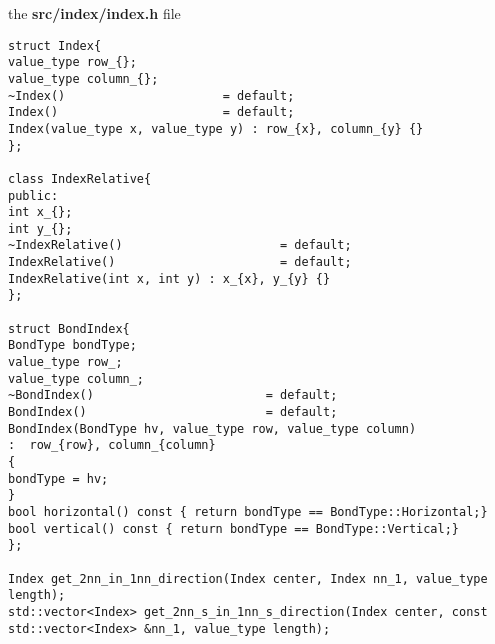 
the \textbf{src/index/index.h} file
\begin{lstlisting}[style=CStyle]
struct Index{
value_type row_{};
value_type column_{};
~Index()                      = default;
Index()                       = default;
Index(value_type x, value_type y) : row_{x}, column_{y} {}
};

class IndexRelative{
public:
int x_{};
int y_{};
~IndexRelative()                      = default;
IndexRelative()                       = default;
IndexRelative(int x, int y) : x_{x}, y_{y} {}
};

struct BondIndex{
BondType bondType;
value_type row_;
value_type column_;
~BondIndex()                        = default;
BondIndex()                         = default;
BondIndex(BondType hv, value_type row, value_type column)
:  row_{row}, column_{column}
{
bondType = hv;
}
bool horizontal() const { return bondType == BondType::Horizontal;}
bool vertical() const { return bondType == BondType::Vertical;}
};

Index get_2nn_in_1nn_direction(Index center, Index nn_1, value_type length);
std::vector<Index> get_2nn_s_in_1nn_s_direction(Index center, const std::vector<Index> &nn_1, value_type length);
\end{lstlisting}


